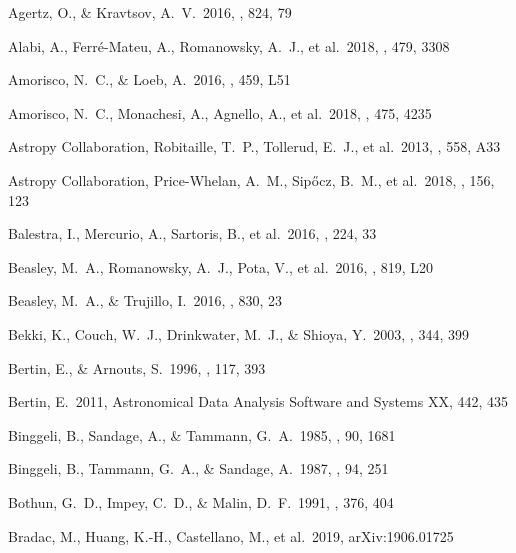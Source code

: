 \documentclass[iop,tighten,twocolumn,apj,floatfix]{emulateapj}
\begin{document}
\begin{thebibliography}{}

 Agertz, O., \& Kravtsov, A.~V.\ 2016, \apj, 824, 79

 Alabi, A., Ferr{\'e}-Mateu, A., Romanowsky, A.~J., et al.\ 2018, \mnras, 479, 3308

 Amorisco, N.~C., \&
Loeb, A.\ 2016, \mnras, 459, L51

 Amorisco, N.~C., Monachesi, A., Agnello, A., et al.\ 2018, \mnras, 475, 4235

 Astropy
Collaboration, Robitaille, T.~P., Tollerud, E.~J., et al.\ 2013, \aap,
558, A33

 Astropy
Collaboration, Price-Whelan, A.~M., Sip{\H o}cz, B.~M., et al.\ 2018, \aj,
156, 123

 Balestra, I., Mercurio,
    A., Sartoris, B., et al.\ 2016, \apjs, 224, 33

 Beasley, M.~A., Romanowsky, A.~J., Pota, V., et al.\ 2016, \apjl, 819, L20

 Beasley, M.~A., \& Trujillo, I.\ 2016, \apj, 830, 23

 Bekki, K., Couch, W.~J.,
Drinkwater, M.~J., \& Shioya, Y.\ 2003, \mnras, 344, 399

 Bertin, E., \& Arnouts, S.\
1996, \aaps, 117, 393 

 Bertin, E.\ 2011, Astronomical
Data Analysis Software and Systems XX, 442, 435

 Binggeli, B., Sandage, A., \& Tammann, G.~A.\ 1985, \aj, 90, 1681

 Binggeli, B., Tammann, G.~A., \& Sandage, A.\ 1987, \aj, 94, 251

 Bothun, G.~D., Impey, C.~D., \& Malin, D.~F.\ 1991, \apj, 376, 404

 Bradac, M., Huang, K.-H.,
    Castellano, M., et al.\ 2019, arXiv:1906.01725


\end{thebibliography}
\end{document}
